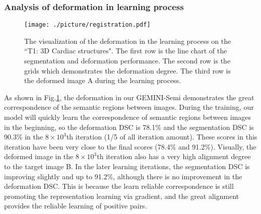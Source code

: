 \subsubsection{Analysis of deformation in learning process}
\begin{figure}
  \centering
  \texttt{[image: ./picture/registration.pdf]}
  \caption{The visualization of the deformation in the learning process on the ``T1: 3D Cardiac structures". The first row is the line chart of the segmentation and deformation performance. The second row is the grids which demonstrates the deformation degree. The third row is the deformed image A during the learning process.}\label{Fig:registration}
\end{figure}
As shown in Fig.\ref{Fig:registration}, the deformation in our GEMINI-Semi demonstrates the great correspondence of the semantic regions between images. During the training, our model will quickly learn the correspondence of semantic regions between images in the beginning, so the deformation DSC is 78.1\% and the segmentation DSC is 90.3\% in the $8\times10^{3}$th iteration (1/5 of all iteration amount). These scores in this iteration have been very close to the final scores (78.4\% and 91.2\%). Visually, the deformed image in the $8\times10^{3}$th iteration also has a very high alignment degree to the target image B. In the later learning iterations, the segmentation DSC is improving slightly and up to 91.2\%, although there is no improvement in the deformation DSC. This is because the learn reliable correspondence is still promoting the representation learning via gradient, and the great alignment provides the reliable learning of positive pairs.
